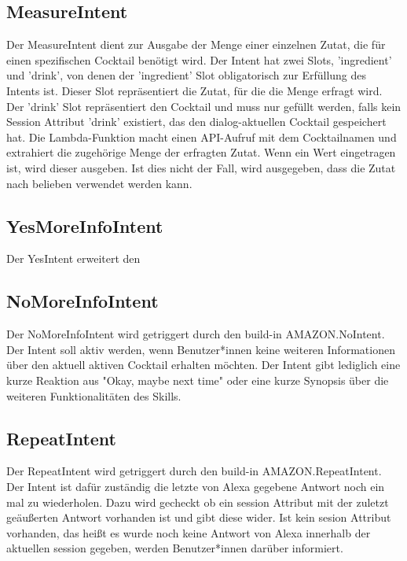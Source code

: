 \documentclass[12pt,letterpaper]{article}
\begin{document}
\subsection{MeasureIntent}
Der MeasureIntent dient zur Ausgabe der Menge einer einzelnen Zutat, die für einen spezifischen Cocktail benötigt wird.
Der Intent hat zwei Slots, 'ingredient' und 'drink', von denen der 'ingredient' Slot obligatorisch zur Erfüllung des Intents ist. 
Dieser Slot repräsentiert die Zutat, für die die Menge erfragt wird. Der 'drink' Slot repräsentiert den Cocktail und muss nur gefüllt werden,
falls kein Session Attribut 'drink' existiert, das den dialog-aktuellen Cocktail gespeichert hat.
Die Lambda-Funktion macht einen API-Aufruf mit dem Cocktailnamen und extrahiert die zugehörige Menge der erfragten Zutat.
Wenn ein Wert eingetragen ist, wird dieser ausgeben. Ist dies nicht der Fall, wird ausgegeben, dass die Zutat nach belieben verwendet werden kann. \\


\subsection{YesMoreInfoIntent}
Der YesIntent erweitert den 
\subsection{NoMoreInfoIntent}
Der NoMoreInfoIntent wird getriggert durch den build-in AMAZON.NoIntent. Der Intent soll aktiv werden, wenn Benutzer*innen keine weiteren Informationen über den aktuell aktiven Cocktail erhalten möchten. Der Intent gibt lediglich eine kurze Reaktion aus "Okay, maybe next time" oder eine kurze Synopsis über die weiteren Funktionalitäten des Skills.
 
\subsection{RepeatIntent}
Der RepeatIntent wird getriggert durch den build-in AMAZON.RepeatIntent. Der Intent ist dafür zuständig die letzte von Alexa gegebene Antwort noch ein mal zu wiederholen. Dazu wird gecheckt ob ein session Attribut mit der zuletzt geäußerten Antwort vorhanden ist und gibt diese wider. Ist kein sesion Attribut vorhanden, das heißt es wurde noch keine Antwort von Alexa innerhalb der aktuellen session gegeben, werden Benutzer*innen darüber informiert.

\end{document}
